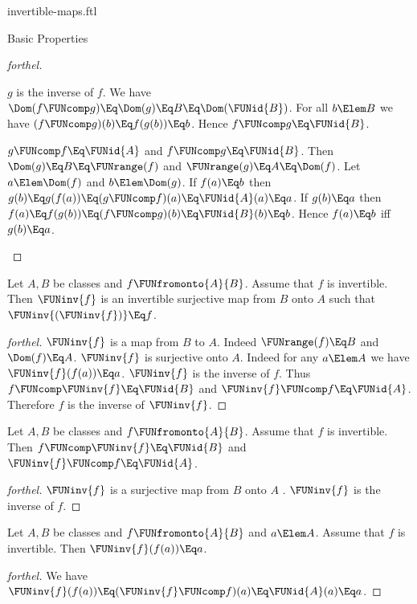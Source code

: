 \documentclass{stex}
\begin{document}
\begin{smodule}{invertible-maps.ftl}
\begin{sfragment}{Basic Properties}
\begin{proof}[forthel]
\begin{case}{$g$ is the inverse of $f$.}
      We have
      $\Dom(f \FUNcomp g)
        \Eq \Dom(g)
        \Eq B
        \Eq \Dom(\FUNid{B})$.
      For all $b \Elem B$ we have
      $(f \FUNcomp g)(b)
        \Eq f(g(b))
        \Eq b$.
      Hence $f \FUNcomp g \Eq \FUNid{B}$.
    \end{case}

    \begin{case}{$g \FUNcomp f \Eq \FUNid{A}$ and $f \FUNcomp g \Eq \FUNid{B}$.}
      Then $\Dom(g)
        \Eq B
        \Eq \FUNrange(f)$
      and $\FUNrange(g)
        \Eq A
        \Eq \Dom(f)$.
      Let $a \Elem \Dom(f)$ and $b \Elem \Dom(g)$.
      If $f(a) \Eq b$ then
      $g(b)
        \Eq g(f(a))
        \Eq (g \FUNcomp f)(a)
        \Eq \FUNid{A}(a)
        \Eq a$.
      If $g(b) \Eq a$ then
      $f(a)
        \Eq f(g(b))
        \Eq (f \FUNcomp g)(b)
        \Eq \FUNid{B}(b)
        \Eq b$.
      Hence $f(a) \Eq b$ iff $g(b) \Eq a$.
    \end{case}
  \end{proof}

  \begin{proposition}[forthel,id=FOUNDATIONS_09_8414736098000896]
    Let $A, B$ be classes and $f \FUNfromonto{A}{B}$.
    Assume that $f$ is invertible.
    Then $\FUNinv{f}$ is an invertible surjective map from $B$ onto $A$ such that $\FUNinv{(\FUNinv{f})} \Eq f$.
  \end{proposition}
  \begin{proof}[forthel]
    $\FUNinv{f}$ is a map from $B$ to $A$.
    Indeed $\FUNrange(f) \Eq B$ and $\Dom(f) \Eq A$.
    $\FUNinv{f}$ is surjective onto $A$.
    Indeed for any $a \Elem A$ we have $\FUNinv{f}(f(a)) \Eq a$.
    $\FUNinv{f}$ is the inverse of $f$.
    Thus $f \FUNcomp \FUNinv{f} \Eq \FUNid{B}$ and $\FUNinv{f} \FUNcomp f \Eq \FUNid{A}$.
    Therefore $f$ is the inverse of $\FUNinv{f}$.
  \end{proof}

  \begin{proposition}[forthel,id=FOUNDATIONS_09_4577560740495360]
    Let $A, B$ be classes and $f \FUNfromonto{A}{B}$.
    Assume that $f$ is invertible.
    Then $f \FUNcomp \FUNinv{f} \Eq \FUNid{B}$ and $\FUNinv{f} \FUNcomp f \Eq \FUNid{A}$.
  \end{proposition}
  \begin{proof}[forthel]
    $\FUNinv{f}$ is a surjective map from $B$ onto $A$ .
    $\FUNinv{f}$ is the inverse of $f$.
  \end{proof}

  \begin{proposition}[forthel,id=FOUNDATIONS_09_4606651604664320]
    Let $A, B$ be classes and $f \FUNfromonto{A}{B}$ and $a \Elem A$.
    Assume that $f$ is invertible.
    Then $\FUNinv{f}(f(a)) \Eq a$.
  \end{proposition}
  \begin{proof}[forthel]
    We have $\FUNinv{f}(f(a)) \Eq (\FUNinv{f} \FUNcomp f)(a) \Eq \FUNid{A}(a) \Eq a$.
  \end{proof}


\end{sfragment}
\end{smodule}
\end{document}
